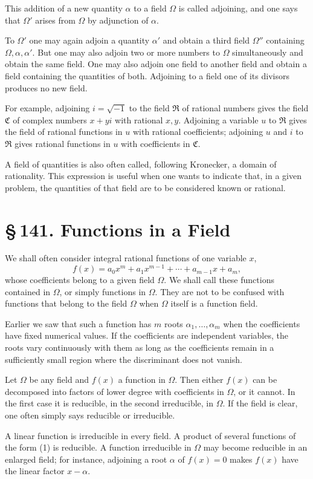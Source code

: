 \documentclass[11pt]{article}
\providecommand{\sect}[2]{\section*{\S\,#1. #2}}
\begin{document}
This addition of a new quantity $\alpha$ to a field $\Omega$ is called adjoining, and one says that $\Omega'$ arises from $\Omega$ by adjunction of $\alpha$.

To $\Omega'$ one may again adjoin a quantity $\alpha'$ and obtain a third field $\Omega''$ containing $\Omega,\alpha,\alpha'$. But one may also adjoin two or more numbers to $\Omega$ simultaneously and obtain the same field. One may also adjoin one field to another field and obtain a field containing the quantities of both. Adjoining to a field one of its divisors produces no new field.

For example, adjoining $i=\sqrt{-1}$ to the field $\mathfrak R$ of rational numbers gives the field $\mathfrak C$ of complex numbers $x+yi$ with rational $x,y$. Adjoining a variable $u$ to $\mathfrak R$ gives the field of rational functions in $u$ with rational coefficients; adjoining $u$ and $i$ to $\mathfrak R$ gives rational functions in $u$ with coefficients in $\mathfrak C$.

A field of quantities is also often called, following Kronecker, a domain of rationality. This expression is useful when one wants to indicate that, in a given problem, the quantities of that field are to be considered known or rational.

\sect{141}{Functions in a Field}

We shall often consider integral rational functions of one variable $x$,
\[
\tag{1}
        f(x)=a_0x^m+a_1x^{m-1}+\cdots+a_{m-1}x+a_m,
\]
whose coefficients belong to a given field $\Omega$. We shall call these functions contained in $\Omega$, or simply functions in $\Omega$. They are not to be confused with functions that belong to the field $\Omega$ when $\Omega$ itself is a function field.

Earlier we saw that such a function has $m$ roots $\alpha_1,\ldots,\alpha_m$ when the coefficients have fixed numerical values. If the coefficients are independent variables, the roots vary continuously with them as long as the coefficients remain in a sufficiently small region where the discriminant does not vanish.

Let $\Omega$ be any field and $f(x)$ a function in $\Omega$. Then either $f(x)$ can be decomposed into factors of lower degree with coefficients in $\Omega$, or it cannot. In the first case it is reducible, in the second irreducible, in $\Omega$. If the field is clear, one often simply says reducible or irreducible.

A linear function is irreducible in every field. A product of several functions of the form (1) is reducible. A function irreducible in $\Omega$ may become reducible in an enlarged field; for instance, adjoining a root $\alpha$ of $f(x)=0$ makes $f(x)$ have the linear factor $x-\alpha$.
\end{document}
